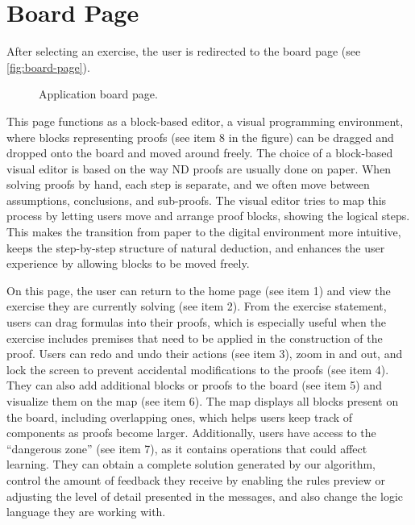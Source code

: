 \section{Board Page}
After selecting an exercise, the user is redirected to the board page (see \autoref{fig:board-page}). 

\begin{figure}[h]
    \centering
    \caption{Application board page.}
    \label{fig:board-page}
\end{figure}

This page functions as a block-based editor, a visual programming environment, where blocks representing proofs (see item 8 in the figure) can be dragged and dropped onto the board and moved around freely. The choice of a block-based visual editor is based on the way \gls{ND} proofs are usually done on paper. When solving proofs by hand, each step is separate, and we often move between assumptions, conclusions, and sub-proofs. The visual editor tries to map this process by letting users move and arrange proof blocks, showing the logical steps. This makes the transition from paper to the digital environment more intuitive, keeps the step-by-step structure of natural deduction, and enhances the user experience by allowing blocks to be moved freely.

On this page, the user can return to the home page (see item 1) and view the exercise they are currently solving (see item 2). From the exercise statement, users can drag formulas into their proofs, which is especially useful when the exercise includes premises that need to be applied in the construction of the proof. Users can redo and undo their actions (see item 3), zoom in and out, and lock the screen to prevent accidental modifications to the proofs (see item 4). They can also add additional blocks or proofs to the board (see item 5) and visualize them on the map (see item 6). The map displays all blocks present on the board, including overlapping ones, which helps users keep track of components as proofs become larger. Additionally, users have access to the ``dangerous zone'' (see item 7), as it contains operations that could affect learning. They can obtain a complete solution generated by our algorithm, control the amount of feedback they receive by enabling the rules preview or adjusting the level of detail presented in the messages, and also change the logic language they are working with.


